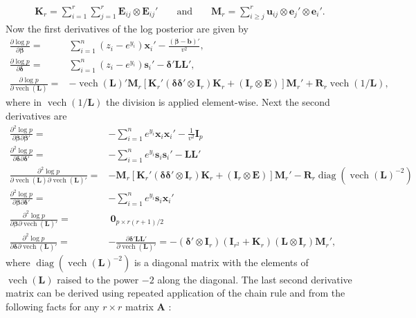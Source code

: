 \documentclass[12pt]{article}
\DeclareMathOperator{\vech}{vech}
\DeclareMathOperator{\diag}{diag}
\begin{document}
\begin{align*}
\bm{K}_r = \sum_{i=1}^r\sum_{j=1}^r\bm{E}_{ij} \otimes \bm{E}_{ij}' && \mbox{ and } &&\bm{M}_r = \sum_{i\ge j}^r\bm{u}_{ij}\otimes \bm{e}_j'\otimes \bm{e}_i'.
\end{align*}
Now the first derivatives of the log posterior are given by
\begin{align*}
\frac{\partial \log p}{\partial \bm{\beta}} =& \sum_{i=1}^n(z_i - e^{y_i})\bm{x}_i' - \frac{(\bm{\beta} - \bm{b})'}{v^2},\\
\frac{\partial \log p}{\partial \bm{\delta}} =& \sum_{i=1}^n(z_i - e^{y_i})\bm{s}_i' - \bm{\delta}'\bm{L}\bm{L}',\\
\frac{\partial \log p}{\partial \vech(\bm{L})} =& -\vech(\bm{L})'\bm{M}_r\left[\bm{K}_r'(\bm{\delta}\bm{\delta}'\otimes \bm{I}_r)\bm{K}_r + (\bm{I}_r\otimes \bm{E})\right]\bm{M}_r' + \bm{R}_r\vech(1/\bm{L}),
\end{align*}
where in $\vech(1/\bm{L})$ the division is applied element-wise. Next the second derivatives are
\begin{align*}
\frac{\partial^2 \log p}{\partial \bm{\beta} \partial \bm{\beta}'} =& -\sum_{i=1}^ne^{y_i}\bm{x}_i\bm{x}_i' - \frac{1}{v^2}\bm{I}_p\\
\frac{\partial^2 \log p}{\partial \bm{\delta} \partial \bm{\delta}'} =&-\sum_{i=1}^ne^{y_i}\bm{s}_i\bm{s}_i' - \bm{L}\bm{L}'\\
\frac{\partial^2 \log p}{\partial \vech(\bm{L}) \partial \vech(\bm{L})'} =& -\bm{M}_r\left[\bm{K}_r'(\bm{\delta}\bm{\delta}'\otimes \bm{I}_r)\bm{K}_r + (\bm{I}_r\otimes \bm{E})\right]\bm{M}_r' - \bm{R}_r\diag\left(\vech(\bm{L})^{-2}\right)\\
\frac{\partial^2 \log p}{\partial \bm{\beta} \partial \bm{\delta}'} =& -\sum_{i=1}^ne^{y_i}\bm{s}_i\bm{x}_i'\\
\frac{\partial^2 \log p}{\partial \bm{\beta} \partial \vech(\bm{L})'} =&\  \bm{0}_{p\times r(r+1)/2}\\
\frac{\partial^2 \log p}{\partial \bm{\delta} \partial \vech(\bm{L})'} =&-\frac{\partial \bm{\delta}'\bm{L}\bm{L}'}{\partial \vech(\bm{L})'} =  -(\bm{\delta}' \otimes \bm{I}_r)(\bm{I}_{r^2} + \bm{K}_r)(\bm{L}\otimes \bm{I}_r) \bm{M}_r',
\end{align*}
where $\diag(\vech(\bm{L})^{-2})$ is a diagonal matrix with the elements of $\vech(\bm{L})$ raised to the power $-2$ along the diagonal. The last second derivative matrix can be derived using repeated application of the chain rule and from the following facts for any $r\times r$ matrix $\bm{A}$ \citep{magnus2007matrix}:
\end{document}
